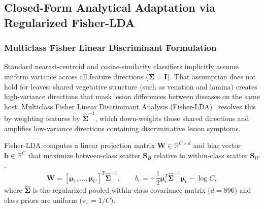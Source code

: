 \subsection{Closed-Form Analytical Adaptation via Regularized Fisher-LDA}
\label{sec:fisher_adaptation}

\subsubsection{Multiclass Fisher Linear Discriminant Formulation}
Standard nearest-centroid and cosine-similarity classifiers implicitly assume uniform variance across all feature directions ($\mathbf{\Sigma} = \mathbf{I}$). That assumption does not hold for leaves: shared vegetative structure (such as venation and lamina) creates high-variance directions that mask lesion differences between diseases on the same host. Multiclass Fisher Linear Discriminant Analysis (Fisher-LDA)~\cite{fisher1936use, rao1948utilization} resolves this by weighting features by $\hat{\mathbf{\Sigma}}^{-1}$, which down-weights those shared directions and amplifies low-variance directions containing discriminative lesion symptoms.

Fisher-LDA computes a linear projection matrix $\mathbf{W} \in \mathbb{R}^{C \times d}$ and bias vector $\mathbf{b} \in \mathbb{R}^C$ that maximize between-class scatter $\mathbf{S}_B$ relative to within-class scatter $\mathbf{S}_W$:
\begin{equation}
    \label{eq:fisher_weights}
    \mathbf{W} = [\boldsymbol{\mu}_1, \dots, \boldsymbol{\mu}_C]^T \hat{\mathbf{\Sigma}}^{-1}, \qquad
    b_c = -\frac{1}{2}\boldsymbol{\mu}_c^T \hat{\mathbf{\Sigma}}^{-1}\boldsymbol{\mu}_c - \log C,
\end{equation}
where $\hat{\mathbf{\Sigma}}$ is the regularized pooled within-class covariance matrix ($d = 896$) and class priors are uniform ($\pi_c = 1/C$).

